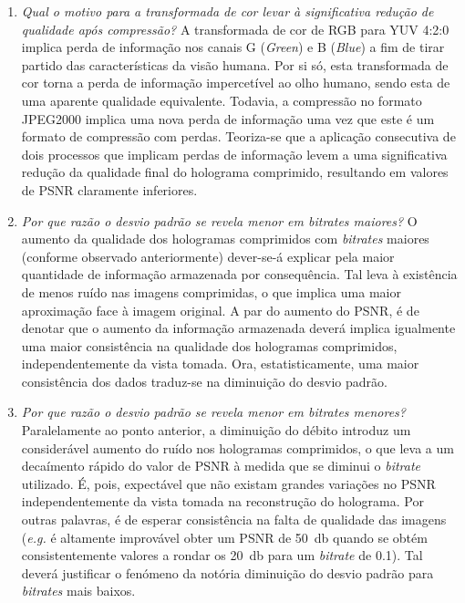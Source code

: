 \begin{enumerate}
    \item \textit{Qual o motivo para a transformada de cor levar à significativa redução de qualidade após compressão?}\newline
    A transformada de cor de \ac{RGB} para YUV 4:2:0 implica perda de informação nos canais G (\textit{Green}) e B (\textit{Blue}) a fim de tirar partido das características da visão humana. Por si só, esta transformada de cor torna a perda de informação impercetível ao olho humano, sendo esta de uma aparente qualidade equivalente.\newline
    Todavia, a compressão no formato JPEG2000 implica uma nova perda de informação uma vez que este é um formato de compressão com perdas.\newline
    Teoriza-se que a aplicação consecutiva de dois processos que implicam perdas de informação levem a uma significativa redução da qualidade final do holograma comprimido, resultando em valores de \ac{PSNR} claramente inferiores.

    \item \textit{Por que razão o desvio padrão se revela menor em \emph{bitrates} maiores?}\newline
    O aumento da qualidade dos hologramas comprimidos com \textit{bitrates} maiores (conforme observado anteriormente) dever-se-á explicar pela maior quantidade de informação armazenada por consequência. Tal leva à existência de menos ruído nas imagens comprimidas, o que implica uma maior aproximação face à imagem original.\newline
    A par do aumento do \ac{PSNR}, é de denotar que o aumento da informação armazenada deverá implica igualmente uma maior consistência na qualidade dos hologramas comprimidos, independentemente da vista tomada.\newline
    Ora, estatisticamente, uma maior consistência dos dados traduz-se na diminuição do desvio padrão.

    \item \textit{Por que razão o desvio padrão se revela menor em \emph{bitrates} menores?}\newline
    Paralelamente ao ponto anterior, a diminuição do débito introduz um considerável aumento do ruído nos hologramas comprimidos, o que leva a um decaímento rápido do valor de \ac{PSNR} à medida que se diminui o \textit{bitrate} utilizado.\newline
    É, pois, expectável que não existam grandes variações no \ac{PSNR} independentemente da vista tomada na reconstrução do holograma. Por outras palavras, é de esperar consistência na falta de qualidade das imagens (\textit{e.g.} é altamente improvável obter um \ac{PSNR} de \SI{50}{\decibel} quando se obtém consistentemente valores a rondar os \SI{20}{\decibel} para um \textit{bitrate} de \SI{0.1}{}).\newline
    Tal deverá justificar o fenómeno da notória diminuição do desvio padrão para \textit{bitrates} mais baixos.
\end{enumerate}

